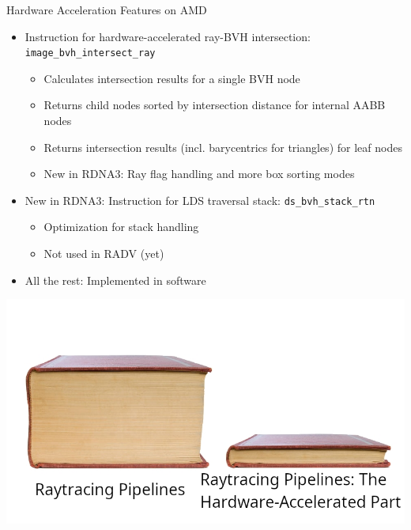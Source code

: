 \documentclass[aspectratio=169,t]{beamer}
\begin{document}
\begin{slide}{Hardware Acceleration Features on AMD}
 \begin{itemize}
  \item Instruction for hardware-accelerated ray-BVH intersection: \texttt{image\_bvh\_intersect\_ray}
  \begin{itemize}
   \item Calculates intersection results for a single BVH node
   \item Returns child nodes sorted by intersection distance for internal AABB nodes
   \item Returns intersection results (incl. barycentrics for triangles) for leaf nodes
   \item New in RDNA3: Ray flag handling and more box sorting modes
  \end{itemize}
 \end{itemize}
 \begin{itemize}
  \item New in RDNA3: Instruction for LDS traversal stack: \texttt{ds\_bvh\_stack\_rtn}
  \begin{itemize}
   \item Optimization for stack handling
   \item Not used in RADV (yet)
  \end{itemize}
 \item All the rest: Implemented in software
 \end{itemize}

 \vspace*{-40pt}
 \hspace*{240pt}
 \includegraphics{graphics/booksmeme.png}
\end{slide}
\end{document}
